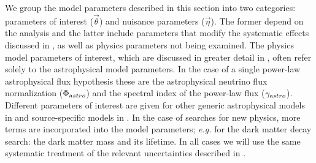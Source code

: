 We group the model parameters described in this section into two categories: parameters of interest ($\vec\theta$) and nuisance parameters ($\vec\eta$).
The former depend on the analysis and the latter include parameters that modify the systematic effects discussed in , as well as physics parameters not being examined.
The physics model parameters of interest, which are discussed in greater detail in , often refer solely to the astrophysical model parameters.
In the case of a single power-law astrophysical flux hypothesis these are the astrophysical neutrino flux normalization ($\Phi_{\textrm astro}$)  and the spectral index of the power-law flux ($\gamma_{\textrm astro}$).
Different parameters of interest are given for other generic astrophysical models in  and source-specific models in .
In the case of searches for new physics, more terms are incorporated into the model parameters; \textit{e.g.} for the dark matter decay search: the dark matter mass and its lifetime.
In all cases we will use the same systematic treatment of the relevant uncertainties described in .

